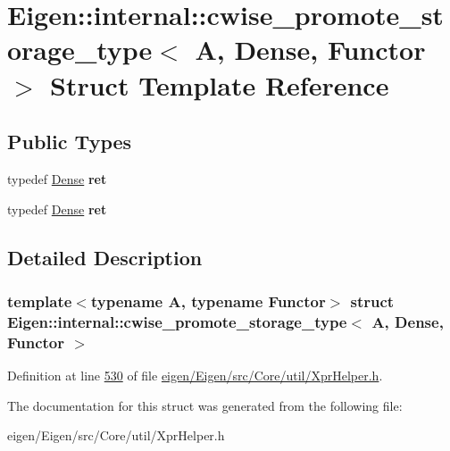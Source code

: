 \hypertarget{struct_eigen_1_1internal_1_1cwise__promote__storage__type_3_01_a_00_01_dense_00_01_functor_01_4}{}\section{Eigen\+:\+:internal\+:\+:cwise\+\_\+promote\+\_\+storage\+\_\+type$<$ A, Dense, Functor $>$ Struct Template Reference}
\label{struct_eigen_1_1internal_1_1cwise__promote__storage__type_3_01_a_00_01_dense_00_01_functor_01_4}
\subsection*{Public Types}
\begin{DoxyCompactItemize}
\item 
\mbox{\label{struct_eigen_1_1internal_1_1cwise__promote__storage__type_3_01_a_00_01_dense_00_01_functor_01_4_a429cffc517ae01cf82bd938252cc7e34}} 
typedef \hyperlink{struct_eigen_1_1_dense}{Dense} {\bfseries ret}
\item 
\mbox{\label{struct_eigen_1_1internal_1_1cwise__promote__storage__type_3_01_a_00_01_dense_00_01_functor_01_4_a429cffc517ae01cf82bd938252cc7e34}} 
typedef \hyperlink{struct_eigen_1_1_dense}{Dense} {\bfseries ret}
\end{DoxyCompactItemize}


\subsection{Detailed Description}
\subsubsection*{template$<$typename A, typename Functor$>$\newline
struct Eigen\+::internal\+::cwise\+\_\+promote\+\_\+storage\+\_\+type$<$ A, Dense, Functor $>$}



Definition at line \hyperlink{eigen_2_eigen_2src_2_core_2util_2_xpr_helper_8h_source_l00530}{530} of file \hyperlink{eigen_2_eigen_2src_2_core_2util_2_xpr_helper_8h_source}{eigen/\+Eigen/src/\+Core/util/\+Xpr\+Helper.\+h}.



The documentation for this struct was generated from the following file\+:\begin{DoxyCompactItemize}
\item 
eigen/\+Eigen/src/\+Core/util/\+Xpr\+Helper.\+h\end{DoxyCompactItemize}
